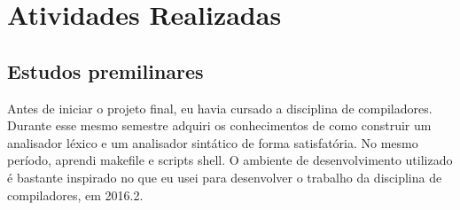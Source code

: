 %
%
% 
%

\chapter{Atividades Realizadas}
\noindent
\section{Estudos premilinares}

Antes de iniciar o projeto final, eu havia cursado a disciplina de compiladores. Durante esse mesmo semestre adquiri os conhecimentos de como construir um analisador léxico e um analisador sintático de forma satisfatória. No mesmo período, aprendi makefile e scripts shell. O ambiente de desenvolvimento utilizado é bastante inspirado no que eu usei para desenvolver o trabalho da disciplina de compiladores, em 2016.2.

